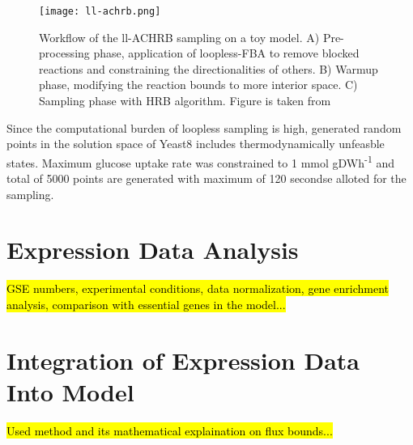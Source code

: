 \begin{figure}[H]
\begin{center}
\texttt{[image: ll-achrb.png]}
\end{center}
\caption[Workflow of the Loopless-ACHRB sampling on a toy model]{Workflow of the ll-ACHRB sampling on a toy model. A) Pre-processing phase, application of loopless-FBA to remove blocked reactions and constraining the directionalities of others. B) Warmup phase, modifying the reaction bounds to more interior space. C) Sampling phase with HRB algorithm. Figure is taken from \cite{saa2016ll}}
\label{fig:achrb}
\end{figure}

Since the computational burden of loopless sampling is high, generated random points in the solution space of Yeast8 includes thermodynamically unfeasble states. Maximum glucose uptake rate was constrained to 1 mmol gDWh\textsuperscript{-1} and total of 5000 points are generated with maximum of 120 secondse alloted for the sampling.

\section{Expression Data Analysis}
\hl{GSE numbers, experimental conditions, data normalization, gene enrichment analysis, comparison with essential genes in the model...}
\section{Integration of Expression Data Into Model}
\hl{Used method and its mathematical explaination on flux bounds...}
